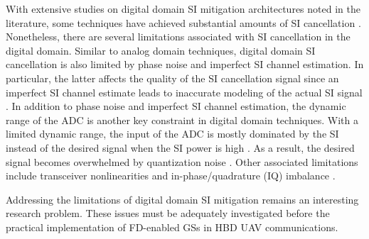 With extensive studies on digital domain SI mitigation architectures noted in the literature, some techniques have achieved substantial amounts of SI cancellation \cite{bernhardt2018self}. Nonetheless, there are several limitations associated with SI cancellation in the digital domain. Similar to analog domain techniques, digital domain SI cancellation is also limited by phase noise and imperfect SI channel estimation. In particular, the latter affects the quality of the SI cancellation signal since an imperfect SI channel estimate leads to inaccurate modeling of the actual SI signal \cite{amjad2018low}. In addition to phase noise and imperfect SI channel estimation, the dynamic range of the ADC is another key constraint in digital domain techniques. With a limited dynamic range, the input of the ADC is mostly dominated by the SI instead of the desired signal when the SI power is high \cite{ahmed2013rate,korpi2014full}. As a result, the desired signal becomes overwhelmed by quantization noise \cite{bernhardt2018self}. Other associated limitations include transceiver nonlinearities \cite{ahmed2015all} and in-phase/quadrature (IQ) imbalance \cite{li2018self}.

Addressing the limitations of digital domain SI mitigation remains an interesting research problem. These issues must be adequately investigated before the practical implementation of FD-enabled GSs in HBD UAV communications.

